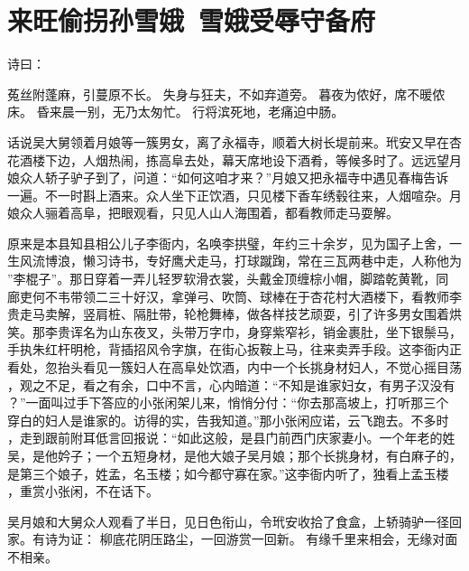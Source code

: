\chapter{来旺偷拐孙雪娥~雪娥受辱守备府}

诗曰：

菟丝附蓬麻，引蔓原不长。
失身与狂夫，不如弃道旁。
暮夜为侬好，席不暖侬床。
昏来晨一别，无乃太匆忙。
行将滨死地，老痛迫中肠。

话说吴大舅领着月娘等一簇男女，离了永福寺，顺着大树长堤前来。玳安又早在杏
花酒楼下边，人烟热闹，拣高阜去处，幕天席地设下酒肴，等候多时了。远远望月
娘众人轿子驴子到了，问道：“如何这咱才来？”月娘又把永福寺中遇见春梅告诉
一遍。不一时斟上酒来。众人坐下正饮酒，只见楼下香车绣毂往来，人烟喧杂。月
娘众人骊着高阜，把眼观看，只见人山人海围着，都看教师走马耍解。

原来是本县知县相公儿子李衙内，名唤李拱璧，年约三十余岁，见为国子上舍，一
生风流博浪，懒习诗书，专好鹰犬走马，打球蹴踘，常在三瓦两巷中走，人称他为
”李棍子”。那日穿着一弄儿轻罗软滑衣裳，头戴金顶缠棕小帽，脚踏乾黄靴，同
廊吏何不韦带领二三十好汉，拿弹弓、吹筒、球棒在于杏花村大酒楼下，看教师李
贵走马卖解，竖肩桩、隔肚带，轮枪舞棒，做各样技艺顽耍，引了许多男女围着烘
笑。那李贵诨名为山东夜叉，头带万字巾，身穿紫窄衫，销金裹肚，坐下银鬃马，
手执朱红杆明枪，背插招风令字旗，在街心扳鞍上马，往来卖弄手段。这李衙内正
看处，忽抬头看见一簇妇人在高阜处饮酒，内中一个长挑身材妇人，不觉心摇目荡
，观之不足，看之有余，口中不言，心内暗道：“不知是谁家妇女，有男子汉没有
？”一面叫过手下答应的小张闲架儿来，悄悄分付：“你去那高坡上，打听那三个
穿白的妇人是谁家的。访得的实，告我知道。”那小张闲应诺，云飞跑去。不多时
，走到跟前附耳低言回报说：“如此这般，是县门前西门庆家妻小。一个年老的姓
吴，是他妗子；一个五短身材，是他大娘子吴月娘；那个长挑身材，有白麻子的，
是第三个娘子，姓孟，名玉楼；如今都守寡在家。”这李衙内听了，独看上孟玉楼
，重赏小张闲，不在话下。

吴月娘和大舅众人观看了半日，见日色衔山，令玳安收拾了食盒，上轿骑驴一径回
家。有诗为证：
柳底花阴压路尘，一回游赏一回新。
有缘千里来相会，无缘对面不相亲。

